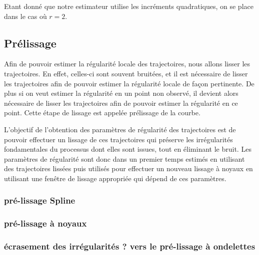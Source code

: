 Etant donné que notre estimateur utilise les incréments quadratiques, on se place dans le cas où $r = 2$.





\subsection{Prélissage}


Afin de pouvoir estimer la régularité locale des trajectoires, nous allons lisser les trajectoires. En effet, celles-ci sont souvent bruitées, et il est nécessaire de lisser les trajectoires afin de pouvoir estimer la régularité locale de façon pertinente. De plus si on veut estimer la régularité en un point non observé, il devient alors nécessaire de lisser les trajectoires afin de pouvoir estimer la régularité en ce point. Cette étape de lissage est appelée prélissage de la courbe.


L'objectif de l'obtention des paramètres de régularité des trajectoires est de pouvoir effectuer un lissage de ces trajectoires qui préserve les irrégularités fondamentales du processus dont elles sont issues, tout en éliminant le bruit. Les paramètres de régularité sont donc dans un premier temps estimés en utilisant des trajectoires lissées puis utilisés pour effectuer un nouveau lissage à noyaux en utilisant une fenêtre de lissage appropriée qui dépend de ces paramètres. 


\subsubsection{pré-lissage Spline}
\subsubsection{pré-lissage à noyaux}
\subsubsection{écrasement des irrégularités ? vers le pré-lissage à ondelettes}

